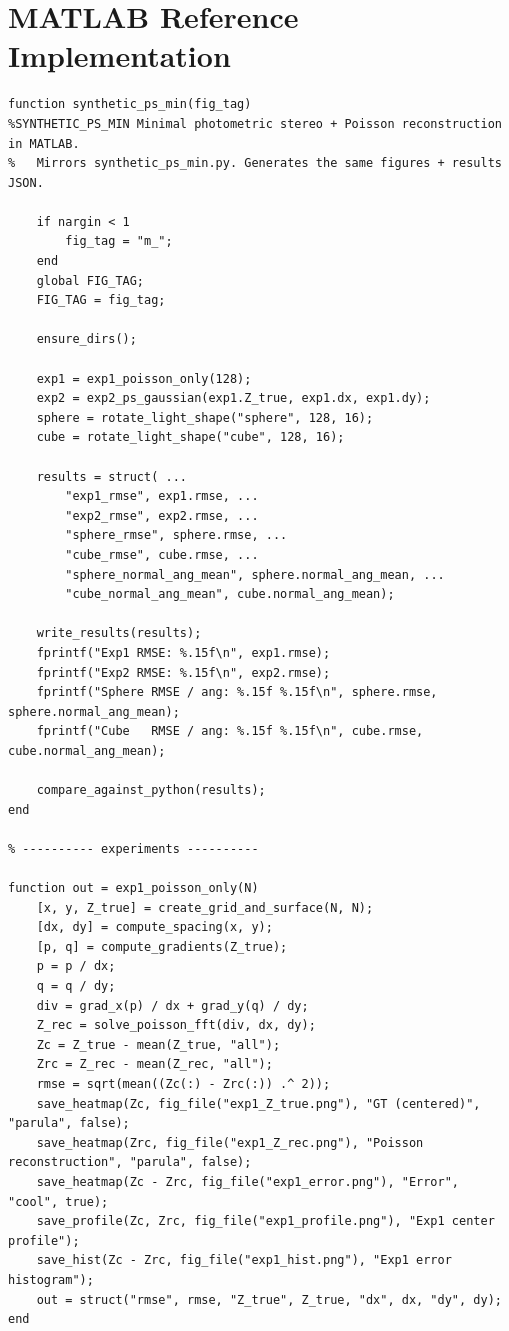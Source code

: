 \documentclass[11pt]{article}
\begin{document}
\section{MATLAB Reference Implementation}
\begin{lstlisting}[caption={Minimal MATLAB photometric stereo + Poisson solver},label={lst:synthetic_ps_min}]
function synthetic_ps_min(fig_tag)
%SYNTHETIC_PS_MIN Minimal photometric stereo + Poisson reconstruction in MATLAB.
%   Mirrors synthetic_ps_min.py. Generates the same figures + results JSON.

    if nargin < 1
        fig_tag = "m_";
    end
    global FIG_TAG;
    FIG_TAG = fig_tag;

    ensure_dirs();

    exp1 = exp1_poisson_only(128);
    exp2 = exp2_ps_gaussian(exp1.Z_true, exp1.dx, exp1.dy);
    sphere = rotate_light_shape("sphere", 128, 16);
    cube = rotate_light_shape("cube", 128, 16);

    results = struct( ...
        "exp1_rmse", exp1.rmse, ...
        "exp2_rmse", exp2.rmse, ...
        "sphere_rmse", sphere.rmse, ...
        "cube_rmse", cube.rmse, ...
        "sphere_normal_ang_mean", sphere.normal_ang_mean, ...
        "cube_normal_ang_mean", cube.normal_ang_mean);

    write_results(results);
    fprintf("Exp1 RMSE: %.15f\n", exp1.rmse);
    fprintf("Exp2 RMSE: %.15f\n", exp2.rmse);
    fprintf("Sphere RMSE / ang: %.15f %.15f\n", sphere.rmse, sphere.normal_ang_mean);
    fprintf("Cube   RMSE / ang: %.15f %.15f\n", cube.rmse, cube.normal_ang_mean);

    compare_against_python(results);
end

% ---------- experiments ----------

function out = exp1_poisson_only(N)
    [x, y, Z_true] = create_grid_and_surface(N, N);
    [dx, dy] = compute_spacing(x, y);
    [p, q] = compute_gradients(Z_true);
    p = p / dx;
    q = q / dy;
    div = grad_x(p) / dx + grad_y(q) / dy;
    Z_rec = solve_poisson_fft(div, dx, dy);
    Zc = Z_true - mean(Z_true, "all");
    Zrc = Z_rec - mean(Z_rec, "all");
    rmse = sqrt(mean((Zc(:) - Zrc(:)) .^ 2));
    save_heatmap(Zc, fig_file("exp1_Z_true.png"), "GT (centered)", "parula", false);
    save_heatmap(Zrc, fig_file("exp1_Z_rec.png"), "Poisson reconstruction", "parula", false);
    save_heatmap(Zc - Zrc, fig_file("exp1_error.png"), "Error", "cool", true);
    save_profile(Zc, Zrc, fig_file("exp1_profile.png"), "Exp1 center profile");
    save_hist(Zc - Zrc, fig_file("exp1_hist.png"), "Exp1 error histogram");
    out = struct("rmse", rmse, "Z_true", Z_true, "dx", dx, "dy", dy);
end


\end{lstlisting}
\end{document}
